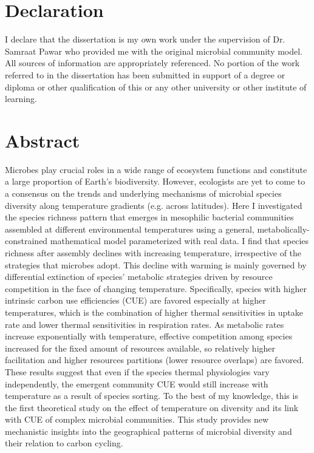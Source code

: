 \documentclass[11pt, a4paper]{article}
\begin{document}
\begin{spacing}{1.5}


\section*{Declaration}

I declare that the dissertation is my own work under the supervision of Dr. Samraat Pawar who provided me with the original microbial community model. All sources of information are appropriately referenced. No portion of the work referred to in the dissertation has been submitted in support of a degree or diploma or other qualification of this or any other university or other institute of learning. 

\clearpage

\section*{Abstract}

Microbes play crucial roles in a wide range of ecosystem functions and constitute a large proportion of Earth's biodiversity. However, ecologists are yet to come to a consensus on the trends and underlying mechanisms of microbial species diversity along temperature gradients (e.g. across latitudes). Here I investigated the species richness pattern that emerges in mesophilic bacterial communities assembled at different environmental temperatures using a general, metabolically-constrained mathematical model parameterized with real data. I find that species richness after assembly declines with increasing temperature, irrespective of the strategies that microbes adopt. This decline with warming is mainly governed by differential extinction of species' metabolic strategies driven by resource competition in the face of changing temperature. Specifically, species with higher intrinsic carbon use efficiencies (CUE) are favored especially at higher temperatures, which is the combination of higher thermal sensitivities in uptake rate and lower thermal sensitivities in respiration rates. As metabolic rates increase exponentially with temperature, effective competition among species increased for the fixed amount of resources available, so relatively higher facilitation and higher resources partitions (lower resource overlaps) are favored. These results suggest that even if the species thermal physiologies vary independently, the emergent community CUE would still increase with temperature as a result of species sorting. To the best of my knowledge, this is the first theoretical study on the effect of temperature on diversity and its link with CUE of complex microbial communities. This study provides new mechanistic insights into the geographical patterns of microbial diversity and their relation to carbon cycling. 


\end{spacing}
\end{document}
